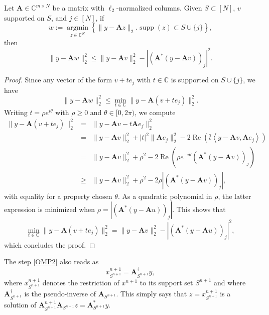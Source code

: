 \begin{lemma}
    \label{lm0.3.3}
    Let $\mathbf{A} \in \mathbb{C}^{m \times N}$ be a matrix with $\ell_2$-normalized columns. Given $S \subset [N]$, $v$ supported on $S$, and $j \in [N]$, if 
    \[
        w := \mathop{\mathrm{argmin}}\limits_{z \in \mathbb{C}^N} \left\{ \|y-\mathbf{A}z\|_2. \mathop{\mathrm{supp}}(z) \subset S \cup \{j\} \right\},
    \]
    then
    \[
        \|y - \mathbf{A}w\|_2^2 \leq \|y-\mathbf{A}v\|_2^2- \left|(\mathbf{A}^*(y - \mathbf{A}v))_j\right|^2.
    \]
\end{lemma}

\begin{proof}
    Since any vector of the form $v + te_j$ with $t \in \mathbb{C}$ is supported on $S \cup \{j\}$, we have
    \[
        \|y - \mathbf{A}w\|_2^2 \leq \min\limits_{t \in \mathbb{C}} \|y - \mathbf{A}(v+te_j)\|_2^2.
    \]
    Writing $t = \rho e^{i\theta}$ with $\rho \geq 0$ and $\theta \in [0,2\pi)$, we compute
        \begin{eqnarray*}
            \|y - \mathbf{A}(v+te_j)\|_2^2 &=& \|y- \mathbf{A}v - t\mathbf{A}e_j\|_2^2 \\
            &=& \|y - \mathbf{A}v\|_2^2 + \left|t\right|^2 \|\mathbf{A}e_j\|_2^2 - 2 \mathop{\mathrm{Re}}\left( \bar{t}\left<y - \mathbf{A}v, \mathbf{A}e_j\right> \right) \\
            &=& \|y - \mathbf{A}v\|_2^2 + \rho^2 - 2\mathop{\mathrm{Re}}\left( \rho e^{-i\theta}(\mathbf{A}^*(y-\mathbf{A}v))_j \right) \\
            &\geq& \|y - \mathbf{A}v\|_2^2 + \rho^2 - 2\rho\left|(\mathbf{A}^*(y-\mathbf{A}v))_j\right|,
        \end{eqnarray*}
        with equality for a property chosen $\theta$. As a quadratic polynomial in $\rho$, the latter expression is minimized when $\rho = \left|(\mathbf{A}^* (y - \mathbf{A}u))_j\right|$. This shows that
        \[
            \min\limits_{t \in \mathbb{C}} \|y-\mathbf{A}(v + t e_j)\|_2^2 = \| y - \mathbf{A} v\|_2^2 - \left|(\mathbf{A}^*(y - \mathbf{A}u))_j\right|^2,
        \]
        which concludes the proof.
\end{proof}

The step \cref{OMP2} also reads as 
\[
    x_{S^{n+1}}^{n+1} = \mathbf{A}_{S^{n+1}}^{\dagger}y,
\]
where $x_{S^{n+1}}^{n+1}$ denotes the restriction of $x^{n+1}$ to its support set $S^{n+1}$ and where $\mathbf{A}_{S^{n+1}}^{\dagger}$ is the pseudo-inverse of $\mathbf{A}_{S^{n+1}}$. This simply says that $z = x_{S^{n+1}}^{n+1}$ is a solution of $\mathbf{A}_{S^{n+1}}^{n+1}\mathbf{A}_{S^{n+1}}z = \mathbf{A}_{S^{n+1}}^*y$. 

